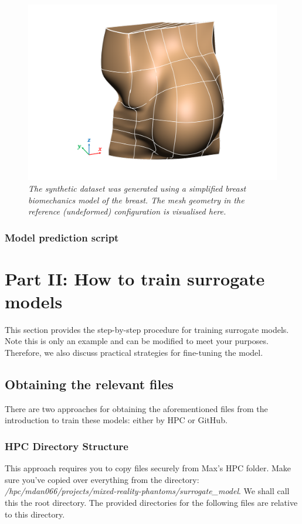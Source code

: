 \documentclass[11pt]{article}
\begin{document}
\begin{figure}
\centering
\includegraphics[scale=0.7]{Images/breast/machine_learning/geometry_diagram.png}
\caption{\textit{\label{fig4}The synthetic dataset was generated using a simplified breast biomechanics model of the breast. The mesh geometry in the reference (undeformed) configuration is visualised here.}} 
\end{figure}

\subsubsection{Model prediction script}


\pagebreak

\section{Part II: How to train surrogate models}
This section provides the step-by-step procedure for training surrogate models. Note this is only an example and can be modified to meet your purposes. Therefore, we also discuss practical strategies for fine-tuning the model. 

\subsection{Obtaining the relevant files}
There are two approaches for obtaining the aforementioned files from the introduction to train these models: either by HPC or GitHub. 

\subsubsection{HPC Directory Structure}
This approach requires you to copy files securely from Max's HPC folder. Make sure you've copied over everything from the directory: \textit{/hpc/mdan066/projects/mixed-reality-phantoms/surrogate\_model}. We shall call this the root directory. The provided directories for the following files are relative to this directory. 
\end{document}
